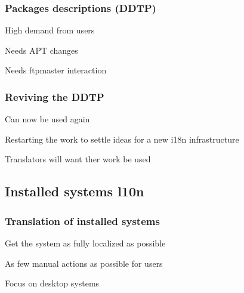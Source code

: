 \documentclass{beamer}
\begin{document}
\begin{frame}
  \frametitle{Packages descriptions (DDTP)}
	\begin{block}
		{High demand from users}
	\end{block}
	\begin{block}
		{Needs APT changes}
	\end{block}
	\begin{block}
		{Needs ftpmaster interaction}
	\end{block}
\end{frame}

\begin{frame}
  \frametitle{Reviving the DDTP}
	\begin{block}
		{Can now be used again}
	\end{block}
	\begin{block}
		{Restarting the work to settle ideas for a new i18n infrastructure}
	\end{block}
	\begin{block}
		{Translators will want ther work be used}
	\end{block}
\end{frame}


\subsection{Installed systems l10n}

\begin{frame}
  \frametitle{Translation of installed systems}
	\begin{block}
		{Get the system as fully localized as possible}
	\end{block}
	\begin{block}
		{As few manual actions as possible for users}
	\end{block}
	\begin{block}
		{Focus on desktop systems}
	\end{block}
\end{frame}
\end{document}
